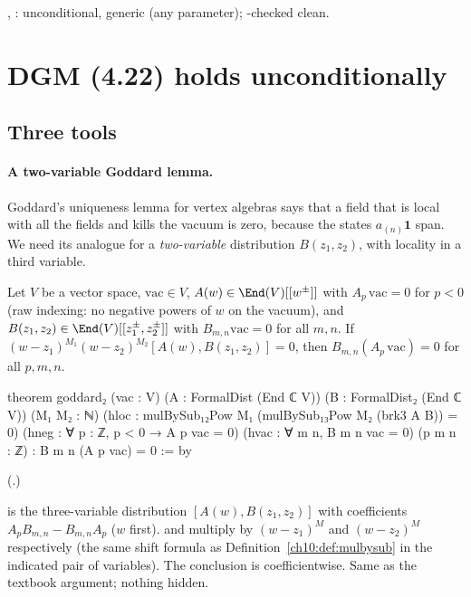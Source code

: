\begin{status}
, : unconditional, generic (any parameter);
 -checked clean.
\end{status}

\section{DGM (4.22) holds unconditionally}\label{ch10:sec:422}

\subsection{Three tools}

\paragraph{A two-variable Goddard lemma.}
Goddard's uniqueness lemma for vertex algebras says that a field that is local with all the
fields and kills the vacuum is zero, because the states $a_{(n)}\mathbf1$ span.  We need its
analogue for a \emph{two-variable} distribution $B(z_1,z_2)$, with locality in a third variable.

\begin{theorem}\label{ch10:thm:goddard2}
Let $V$ be a vector space, $\mathrm{vac}\in V$, $A(w)\in\End(V)[[w^\pm]]$ with $A_p\,\mathrm{vac}=0$ for
$p<0$ (raw indexing: no negative powers of $w$ on the vacuum), and
$B(z_1,z_2)\in\End(V)[[z_1^\pm,z_2^\pm]]$ with $B_{m,n}\mathrm{vac}=0$ for all $m,n$.  If
$(w-z_1)^{M_1}(w-z_2)^{M_2}[A(w),B(z_1,z_2)]=0$, then $B_{m,n}(A_p\,\mathrm{vac})=0$ for all $p,m,n$.
\end{theorem}
\begin{leancode}
theorem goddard₂ (vac : V) (A : FormalDist (End ℂ V)) (B : FormalDist₂ (End ℂ V)) (M₁ M₂ : ℕ)
    (hloc : mulBySub₁₂Pow M₁ (mulBySub₁₃Pow M₂ (brk3 A B)) = 0)
    (hneg : ∀ p : ℤ, p < 0 → A p vac = 0) (hvac : ∀ m n, B m n vac = 0) (p m n : ℤ) :
    B m n (A p vac) = 0 := by
\end{leancode}
(.)
\begin{dictionary}
 is the three-variable distribution $[A(w),B(z_1,z_2)]$ with coefficients
$A_pB_{m,n}-B_{m,n}A_p$ ($w$ first).   and 
multiply by $(w-z_1)^M$ and $(w-z_2)^M$ respectively (the same shift formula as
Definition~\ref{ch10:def:mulbysub} in the indicated pair of variables).  The conclusion is
coefficientwise.  Same as the textbook argument; nothing hidden.
\end{dictionary}

